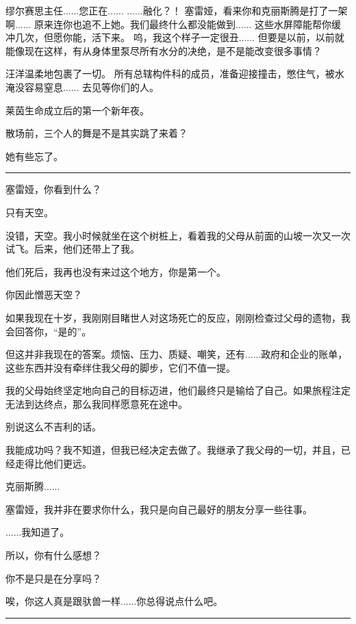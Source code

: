 \documentclass[openany]{book}
\begin{document}
\begin{dialogue}
     缪尔赛思主任......您正在......
     ......融化？！
     塞雷娅，看来你和克丽斯腾是打了一架啊......
     原来连你也追不上她。我们最终什么都没能做到......
     这些水屏障能帮你缓冲几次，但愿你能，活下来。
     呜，我这个样子一定很丑......
     但要是以前，以前就能像现在这样，有从身体里泵尽所有水分的决绝，是不是能改变很多事情？\par
    汪洋温柔地包裹了一切。
     所有总辖构件科的成员，准备迎接撞击，憋住气，被水淹没容易窒息......
     去见等你们的人。\par
    莱茵生命成立后的第一个新年夜。\par
    散场前，三个人的舞是不是其实跳了来着？\par
    她有些忘了。
\end{dialogue}

\par\noindent\rule{\textwidth}{0.4pt}
塞雷娅，你看到什么？\par
只有天空。\par
没错，天空。我小时候就坐在这个树桩上，看着我的父母从前面的山坡一次又一次试飞。后来，他们还带上了我。\par
他们死后，我再也没有来过这个地方，你是第一个。\par
你因此憎恶天空？\par
如果我现在十岁，我刚刚目睹世人对这场死亡的反应，刚刚检查过父母的遗物，我会回答你，“是的”。\par
但这并非我现在的答案。烦恼、压力、质疑、嘲笑，还有......政府和企业的账单，这些东西并没有牵绊住我父母的脚步，它们不值一提。\par
我的父母始终坚定地向自己的目标迈进，他们最终只是输给了自己。如果旅程注定无法到达终点，那么我同样愿意死在途中。\par
别说这么不吉利的话。\par
我能成功吗？我不知道，但我已经决定去做了。我继承了我父母的一切，并且，已经走得比他们更远。\par
克丽斯腾......\par
塞雷娅，我并非在要求你什么，我只是向自己最好的朋友分享一些往事。\par
......我知道了。\par
所以，你有什么感想？\par
你不是只是在分享吗？\par
唉，你这人真是跟驮兽一样......你总得说点什么吧。
\par\noindent\rule{\textwidth}{0.4pt}
\end{document}
